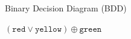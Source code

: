 \documentclass[english, aspectratio=169]{beamer}
\begin{document}
%
\begin{frame}
  \begin{center}
    {\Large Binary Decision Diagram (BDD)}
    \medskip

    $(\mathtt{red} \vee \mathtt{yellow}) \oplus \mathtt{green}$

    \bigskip
    \resizebox{0.25\textwidth}{!}{%
      \begin{tikzpicture}
        
      \end{tikzpicture}
    }
  \end{center}
\end{frame}
\end{document}

